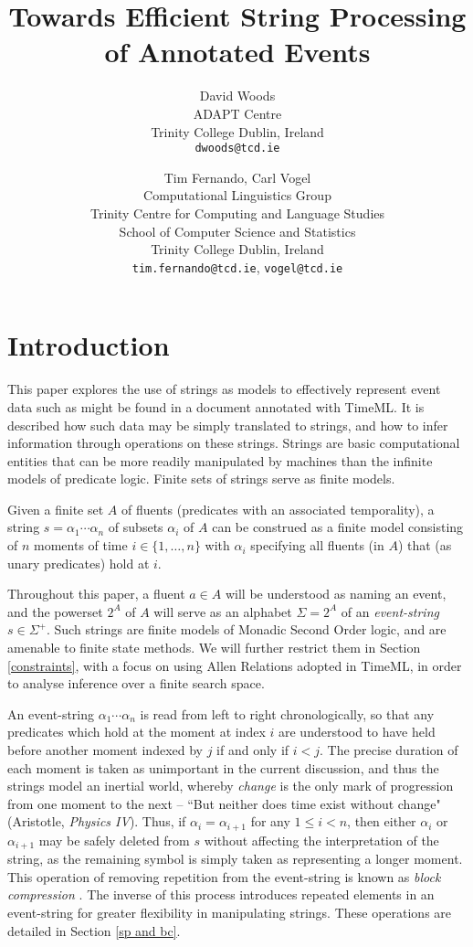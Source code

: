 \documentclass[a4paper,11pt,leqno]{article}
\title{Towards Efficient String Processing of Annotated Events}
\date{}
\author{David Woods\\
	ADAPT Centre\\
	Trinity College Dublin, Ireland\\
	\texttt{dwoods@tcd.ie}
	\and Tim Fernando, Carl Vogel\\
	Computational Linguistics Group \\
	Trinity Centre for Computing and Language Studies\\
	School of Computer Science and Statistics\\
	Trinity College Dublin, Ireland\\
	\texttt{tim.fernando@tcd.ie}, \texttt{vogel@tcd.ie}
}
\begin{document}
\maketitle
\thispagestyle{empty}
\pagestyle{empty}
\section{Introduction}\label{intro}
This paper explores the use of strings as models to effectively represent event 
data such as might be found in a document annotated with TimeML. It is 
described how such data may be simply translated to strings, and how to infer 
information through operations on these strings. Strings are basic 
computational entities that can be more readily manipulated by machines than 
the infinite models of predicate logic. Finite sets of strings serve as finite 
models.

Given a finite set $A$ of fluents (predicates with an associated temporality), 
a string $s=\alpha_1 \cdots \alpha_n$ 
of subsets $\alpha_i$ of $A$ can be construed as a finite model 
consisting of $n$ moments of time $i \in \{1, \ldots, n\}$ with $\alpha_i$ 
specifying all fluents (in $A$) that (as unary predicates) hold at $i$.

Throughout this paper, a fluent $a \in A$ will be understood as naming 
an event, and the powerset $2^{A}$ of $A$ will serve as an alphabet $\Sigma = 
2^{A}$ of an 
\textit{event-string} $s \in \Sigma^+$. Such strings are finite models of 
Monadic Second Order logic, and are amenable to finite state methods. We will 
further restrict them in Section \ref{constraints}, with a focus on using Allen 
Relations adopted in TimeML, in order to analyse inference over a finite search 
space.

An event-string $\alpha_1 \cdots \alpha_n$ is read from left to right 
chronologically, 
so that any predicates which hold at the moment at index $i$ are understood to 
have held before another moment indexed by $j$ if and only if $i < j$. The 
precise duration of each moment is taken as unimportant in the current 
discussion, 
and thus the strings model an inertial world, whereby \textit{change} is the 
only mark of progression from one moment to the next -- ``But neither does time 
exist without change" (Aristotle, \textit{Physics IV}). Thus, if $\alpha_i = 
\alpha_{i+1}$ for any 
$1 \leq i < n$, then either $\alpha_i$ or $\alpha_{i+1}$ may be safely deleted 
from $s$ without 
affecting the interpretation of the string, as the remaining symbol is simply 
taken as representing a longer moment. This operation of removing 
repetition from 
the event-string is known as \textit{block compression} 
\citep{fernando2016prior}. The inverse of this process introduces repeated 
elements in an event-string for greater flexibility in manipulating strings. 
These operations are detailed in Section \ref{sp and bc}.
\end{document}
